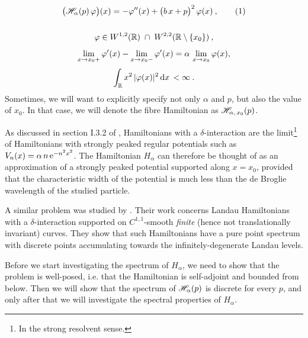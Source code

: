 \begin{gather*}
    \big( \Hf_\alpha(p) \, \varphi \big)(x)
    = -\varphi''(x)
    + \big( b \, x + p \big)^2 \, \varphi(x) \: ,
    \numberthis\label{eqn-dirac-fibre-hamiltonian}
    \\[15pt]
    \varphi \in W^{1,2}(\R) \; \cap \; W^{2,2}( \R \setminus \{ x_0 \}) \: ,
    \\[5pt]
    \lim_{x \to x_0+} \varphi'(x) - \lim_{x \to x_0-} \varphi'(x) = \alpha \, \lim_{x \to x_0} \varphi(x),
    \\[3pt]
    \int_\R x^2 \, |\varphi(x)|^2 \d{x} < \infty \: .
\end{gather*}
Sometimes, we will want to explicitly specify not only $\alpha$ and $p$, but also the value of $x_0$. In that case, we will denote the fibre Hamiltonian as $\mathscr{H}_{\alpha, \, x_0}(p)$.

\medskip

As discussed in section I.3.2 of \cite{Albeverio2005}, Hamiltonians with a $\delta$-interaction are the limit\footnote{In the strong resolvent sense.} of Hamiltonians with strongly peaked regular potentials such as $V_n(x) = \alpha \, n \, \mathrm{e}^{-n^2 x^2}$. The Hamiltonian $H_\alpha$ can therefore be thought of as an approximation of a strongly peaked potential supported along $x = x_0$, provided that the characteristic width of the potential is much less than the de Broglie wavelength of the studied particle.

A similar problem was studied by \cite{BehrndtExner2020}. Their work concerns Landau Hamiltonians with a $\delta$-interaction supported on $C^{1,1}$-smooth \textit{finite} (hence not translationally invariant) curves. They show that such Hamiltonians have a pure point spectrum with discrete points accumulating towards the infinitely-degenerate Landau levels.

\medskip

Before we start investigating the spectrum of $H_\alpha$, we need to show that the problem is well-posed, i.e. that the Hamiltonian is self-adjoint and bounded from below. Then we will show that the spectrum of $\mathscr{H}_\alpha(p)$ is discrete for every $p$, and only after that we will investigate the spectral properties of $H_\alpha$.

